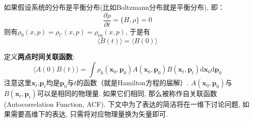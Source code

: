     如果假设系统的分布是平衡分布(比如Boltzmann分布就是平衡分布), 即：
    \begin{equation}
        \frac {\partial \rho}{\partial t} = \{ H, \rho\} = 0
    \end{equation}
    则有$\rho_0(x,p) = \rho_{t'}(x, p) = \rho_{\mathrm{eq}}(x, p)$, 于是有
    \begin{equation}
        \langle B(t) \rangle = \langle B(0) \rangle
    \end{equation}

    \splitline

    定义\textbf{两点时间关联函数}:
    \begin{equation}
        \langle A(0)B(t) \rangle = \int \rho_0(\bm{x}_0,\bm{p}_0) A(\bm{x}_0,\bm{p}_0) B(\bm{x}_t,\bm{p}_t) \mathrm{d}\bm{x}_0 \mathrm{d}\bm{p}_0
    \end{equation}
    注意这里$\bm{x}_t$,$\bm{p}_t$均是$\bm{p}_0$与$t$的函数（就是Hamilton方程的届解）.
     $A(\bm{x}_0,\bm{p}_0)$与$B(\bm{x}_t,\bm{p}_t)$可以是相同的物理量. 如果它们相同, 
     那么被称作自关联函数(Autocorrelation Function, ACF). 
     下文中为了表达的简洁将在一维下讨论问题, 如果需要高维下的表达, 只需将对应物理量换为矢量即可.

